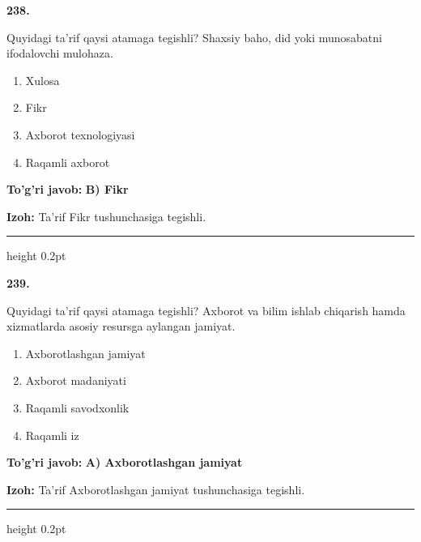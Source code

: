 \documentclass[10pt,a4paper,oneside]{article}
\begin{document}
\noindent\textbf{\color{ink}238.}
\par
Quyidagi ta'rif qaysi atamaga tegishli? Shaxsiy baho, did yoki munosabatni ifodalovchi mulohaza.
\begin{enumerate}[label=\Alph*),leftmargin=9mm]
\item Xulosa
\item Fikr
\item Axborot texnologiyasi
\item Raqamli axborot
\end{enumerate}
\begin{tcolorbox}[enhanced,breakable,colback=teal!4,colframe=teal!50!black,boxrule=0.5pt,arc=1.1mm,left=3mm,right=3mm,top=1.7mm,bottom=1.7mm,before skip=2mm,after skip=2mm]
\textbf{\color{teal}To'g'ri javob:} \textbf{B) Fikr}
\par\smallskip
\textbf{Izoh:} Ta'rif Fikr tushunchasiga tegishli.
\end{tcolorbox}
\vspace{2mm}\hrule height 0.2pt \vspace{3mm}

\noindent\textbf{\color{ink}239.}
\par
Quyidagi ta'rif qaysi atamaga tegishli? Axborot va bilim ishlab chiqarish hamda xizmatlarda asosiy resursga aylangan jamiyat.
\begin{enumerate}[label=\Alph*),leftmargin=9mm]
\item Axborotlashgan jamiyat
\item Axborot madaniyati
\item Raqamli savodxonlik
\item Raqamli iz
\end{enumerate}
\begin{tcolorbox}[enhanced,breakable,colback=teal!4,colframe=teal!50!black,boxrule=0.5pt,arc=1.1mm,left=3mm,right=3mm,top=1.7mm,bottom=1.7mm,before skip=2mm,after skip=2mm]
\textbf{\color{teal}To'g'ri javob:} \textbf{A) Axborotlashgan jamiyat}
\par\smallskip
\textbf{Izoh:} Ta'rif Axborotlashgan jamiyat tushunchasiga tegishli.
\end{tcolorbox}
\vspace{2mm}\hrule height 0.2pt \vspace{3mm}
\end{document}
